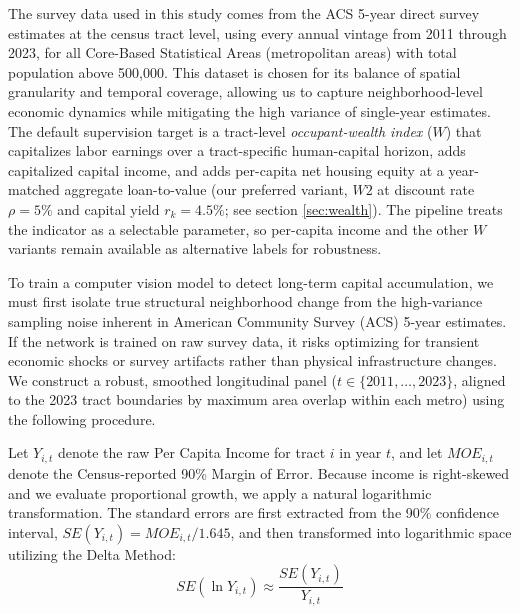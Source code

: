 \documentclass[conference]{IEEEtran}
\begin{document}
The survey data used in this study comes from the ACS 5-year direct survey estimates at the census tract level, using every annual vintage from 2011 through 2023, for all Core-Based Statistical Areas (metropolitan areas) with total population above 500{,}000. This dataset is chosen for its balance of spatial granularity and temporal coverage, allowing us to capture neighborhood-level economic dynamics while mitigating the high variance of single-year estimates. The default supervision target is a tract-level \emph{occupant-wealth index} ($W$) that capitalizes labor earnings over a tract-specific human-capital horizon, adds capitalized capital income, and adds per-capita net housing equity at a year-matched aggregate loan-to-value (our preferred variant, $W2$ at discount rate $\rho = 5\%$ and capital yield $r_k = 4.5\%$; see section \ref{sec:wealth}). The pipeline treats the indicator as a selectable parameter, so per-capita income and the other $W$ variants remain available as alternative labels for robustness.

To train a computer vision model to detect long-term capital accumulation, we must first isolate true structural neighborhood change from the high-variance sampling noise inherent in American Community Survey (ACS) 5-year estimates. If the network is trained on raw survey data, it risks optimizing for transient economic shocks or survey artifacts rather than physical infrastructure changes. We construct a robust, smoothed longitudinal panel ($t \in \{2011, \ldots, 2023\}$, aligned to the 2023 tract boundaries by maximum area overlap within each metro) using the following procedure.


Let $Y_{i,t}$ denote the raw Per Capita Income for tract $i$ in year $t$, and let $MOE_{i,t}$ denote the Census-reported 90\% Margin of Error. Because income is right-skewed and we evaluate proportional growth, we apply a natural logarithmic transformation. The standard errors are first extracted from the 90\% confidence interval, $SE(Y_{i,t}) = MOE_{i,t} / 1.645$, and then transformed into logarithmic space utilizing the Delta Method:
\begin{equation}
SE(\ln Y_{i,t}) \approx \frac{SE(Y_{i,t})}{Y_{i,t}}
\end{equation}
\end{document}
